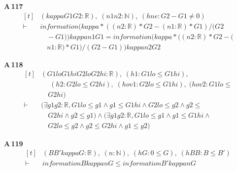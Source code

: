 \noindent\textbf{A\,117}\quad{}
{\footnotesize\[ \begin{aligned}[t]
&(\mathit{kappa} \mathit{G1} \mathit{G2} : \mathbb{R} ),\; (\mathit{n1} \mathit{n2} : \mathbb{N} ),\; (\mathit{hne} : \mathit{G2} - \mathit{G1} \neq 0)\\
\vdash\;&\mathit{information} (\mathit{kappa} * ((\mathit{n2} : \mathbb{R} ) * \mathit{G2} - (\mathit{n1} : \mathbb{R} ) * \mathit{G1}) / (\mathit{G2}\\
&\quad - \mathit{G1})) \mathit{kappa} \mathit{n1} \mathit{G1} = \mathit{information} (\mathit{kappa} * ((\mathit{n2} : \mathbb{R} ) * \mathit{G2} - (\\
&\quad \mathit{n1} : \mathbb{R} ) * \mathit{G1}) / (\mathit{G2} - \mathit{G1})) \mathit{kappa} \mathit{n2} \mathit{G2}
\end{aligned} \]}

\noindent\textbf{A\,118}\quad{}
{\footnotesize\[ \begin{aligned}[t]
&(\mathit{G1lo} \mathit{G1hi} \mathit{G2lo} \mathit{G2hi} : \mathbb{R} ),\; (\mathit{h1} : \mathit{G1lo} \leq \mathit{G1hi}),\\
&\quad \; (\mathit{h2} : \mathit{G2lo} \leq \mathit{G2hi}),\; (\mathit{hov1} : \mathit{G2lo} \leq \mathit{G1hi}),\; (\mathit{hov2} : \mathit{G1lo} \leq\\
&\quad \mathit{G2hi})\\
\vdash\;&(\exists \mathit{g1} \mathit{g2} : \mathbb{R} , \mathit{G1lo} \leq \mathit{g1} \wedge \mathit{g1} \leq \mathit{G1hi} \wedge \mathit{G2lo} \leq \mathit{g2} \wedge \mathit{g2} \leq\\
&\quad \mathit{G2hi} \wedge \mathit{g2} \leq \mathit{g1}) \wedge (\exists \mathit{g1} \mathit{g2} : \mathbb{R} , \mathit{G1lo} \leq \mathit{g1} \wedge \mathit{g1} \leq \mathit{G1hi} \wedge\\
&\quad \mathit{G2lo} \leq \mathit{g2} \wedge \mathit{g2} \leq \mathit{G2hi} \wedge \mathit{g1} \leq \mathit{g2})
\end{aligned} \]}

\noindent\textbf{A\,119}\quad{}
{\footnotesize\[ \begin{aligned}[t]
&(\mathit{B} \mathit{B'} \mathit{kappa} \mathit{G} : \mathbb{R} ),\; (\mathit{n} : \mathbb{N} ),\; (\mathit{hG} : 0 \leq \mathit{G}),\; (\mathit{hBB} : \mathit{B} \leq \mathit{B'})\\
\vdash\;&\mathit{information} \mathit{B} \mathit{kappa} \mathit{n} \mathit{G} \leq \mathit{information} \mathit{B'} \mathit{kappa} \mathit{n} \mathit{G}
\end{aligned} \]}

